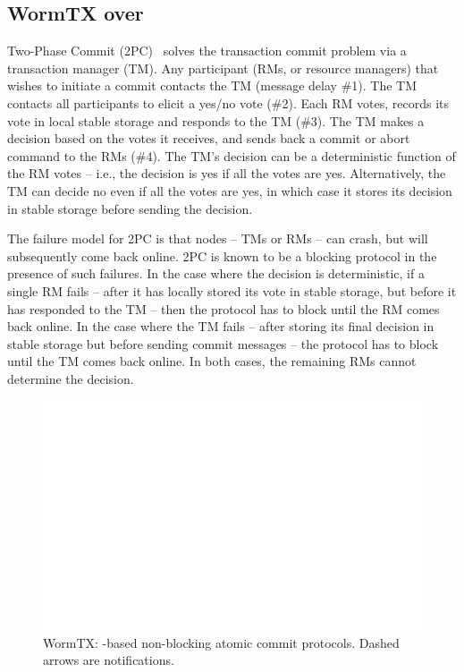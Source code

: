 \subsection{WormTX over \sysname{}}

Two-Phase Commit (2PC)~\cite{distsys} solves the transaction commit problem via a transaction manager (TM). Any participant (RMs, or resource managers) that wishes to initiate a commit contacts the TM (message delay \#1). The TM contacts all participants to elicit a yes/no vote (\#2). Each RM votes, records its vote in local stable storage and responds to the TM (\#3). The TM makes a decision based on the votes it receives, and sends back a commit or abort command to the RMs (\#4). The TM's decision can be a deterministic function of the RM votes -- i.e., the decision is yes if all the votes are yes. Alternatively, the TM can decide no even if all the votes are yes, in which case it stores its decision in stable storage before sending the decision.

The failure model for 2PC is that nodes -- TMs or RMs -- can crash, but will subsequently come back online. 2PC is known to be a blocking protocol in the presence of such failures. In the case where the decision is deterministic, if a single RM fails -- after it has locally stored its vote in stable storage, but before it has responded to the TM -- then the protocol has to block until the RM comes back online. In the case where the TM fails -- after storing its final decision in stable storage but before sending commit messages -- the protocol has to block until the TM comes back online. In both cases, the remaining RMs cannot determine the decision. 


\label{sec:wormtx}

\begin{figure}
\centering
\includegraphics[page=5]{pics/pics-longer.pdf}
\caption{WormTX: \WOR{}-based non-blocking atomic commit protocols. Dashed arrows are notifications. \label{fig:commit}}
\vspace{-0.1in}
\end{figure}


